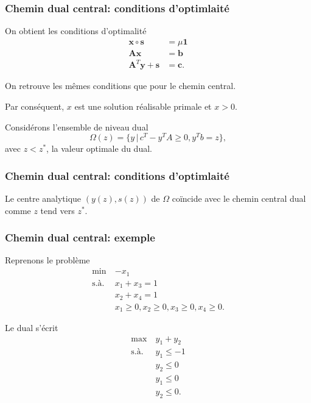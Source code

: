 \documentclass[usepdftitle=false, aspectratio=169]{beamer}
\def\bb{\boldsymbol{b}}
\def\bc{\boldsymbol{c}}
\def\bs{\boldsymbol{s}}
\def\bx{\boldsymbol{x}}
\def\by{\boldsymbol{y}}
\def\bA{\boldsymbol{A}}
\def\bone{\boldsymbol{1}}
\begin{document}
\begin{frame}
\frametitle{Chemin dual central: conditions d'optimlaité}

On obtient les conditions d'optimalité
\begin{align*}
\bx \circ \bs &= \mu \bone \\
\bA\bx &= \bb \\
\bA^T\by + \bs & = \bc.
\end{align*}

\mbox{}

On retrouve les mêmes conditions que pour le chemin central.

\mbox{}

Par conséquent, $x$ est une solution réalisable primale et $x > 0$.

\mbox{}

Considérons l'ensemble de niveau dual
\[
\Omega(z) = \lbrace y \,|\, c^T - y^T A \geq 0, y^T b = z\rbrace,
\]
avec $z < z^*$, la valeur optimale du dual.

\end{frame}

\begin{frame}
\frametitle{Chemin dual central: conditions d'optimlaité}

Le centre analytique $(y(z), s(z))$ de $\Omega$ coïncide avec le chemin central dual comme $z$ tend vers $z^*$.


\end{frame}

\begin{frame}
\frametitle{Chemin dual central: exemple}

Reprenons le problème
\begin{align*}
\min\ & -x_1 \\
\mbox{s.à. } & x_1 + x_3 = 1 \\
& x_2 + x_4 = 1 \\
& x_1 \geq 0, x_2 \geq 0, x_3 \geq 0, x_4 \geq 0.
\end{align*}

Le dual s'écrit
\begin{align*}
\max\ & y_1 + y_2 \\
\mbox{s.à. } & y_1 \leq -1 \\
& y_2 \leq 0 \\
& y_1 \leq 0 \\
& y_2 \leq 0.
\end{align*}

\end{frame}
\end{document}
